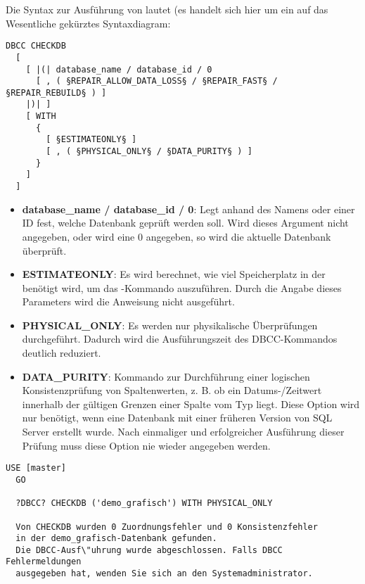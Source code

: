           Die Syntax zur Ausführung von  lautet
          (es handelt sich hier um ein auf das Wesentliche gekürztes
          Syntaxdiagram:
          \begin{lstlisting}[language=ebnf, caption={Die Syntax zu CHECKDB},
          label=admin03_28]
DBCC CHECKDB
  [
    [ |(| database_name / database_id / 0 
      [ , ( §REPAIR_ALLOW_DATA_LOSS§ / §REPAIR_FAST§ / §REPAIR_REBUILD§ ) ]
    |)| ]
    [ WITH
      {
        [ §ESTIMATEONLY§ ]
        [ , ( §PHYSICAL_ONLY§ / §DATA_PURITY§ ) ]
      }
    ]
  ]        
          \end{lstlisting}
          \begin{itemize}
            \item \textbf{database\_name / database\_id / 0}: Legt anhand des
            Namens oder einer ID fest, welche Datenbank geprüft werden soll.
            Wird dieses Argument nicht angegeben, oder wird eine 0 angegeben, so
            wird die aktuelle Datenbank überprüft.
            \item \textbf{ESTIMATEONLY}: Es wird berechnet, wie viel
            Speicherplatz in der  benötigt wird, um das
            -Kommando auszuführen. Durch die Angabe
            dieses Parameters wird die Anweisung nicht ausgeführt.
            \item \textbf{PHYSICAL\_ONLY}: Es werden nur physikalische
            Überprüfungen durchgeführt. Dadurch wird die Ausführungszeit des
            DBCC-Kommandos deutlich reduziert.
            \item \textbf{DATA\_PURITY}: Kommando zur Durchführung einer
            logischen Konsistenzprüfung von Spaltenwerten, z. B. ob ein
            Datums-/Zeitwert innerhalb der gültigen Grenzen einer Spalte vom Typ
             liegt. Diese Option wird nur benötigt, wenn
            eine Datenbank mit einer früheren Version von SQL Server erstellt
            wurde. Nach einmaliger und erfolgreicher Ausführung dieser Prüfung
            muss diese Option nie wieder angegeben werden.
          \end{itemize}
          \begin{lstlisting}[language=ms_sql,caption={Physikalische
          Konsistenzprüfung einer Datenbank mit DBCC},label=admin03_29]
  USE [master]
  GO
  
  ?DBCC? CHECKDB ('demo_grafisch') WITH PHYSICAL_ONLY
  
  Von CHECKDB wurden 0 Zuordnungsfehler und 0 Konsistenzfehler 
  in der demo_grafisch-Datenbank gefunden.
  Die DBCC-Ausf\"uhrung wurde abgeschlossen. Falls DBCC Fehlermeldungen
  ausgegeben hat, wenden Sie sich an den Systemadministrator.
          \end{lstlisting}         
